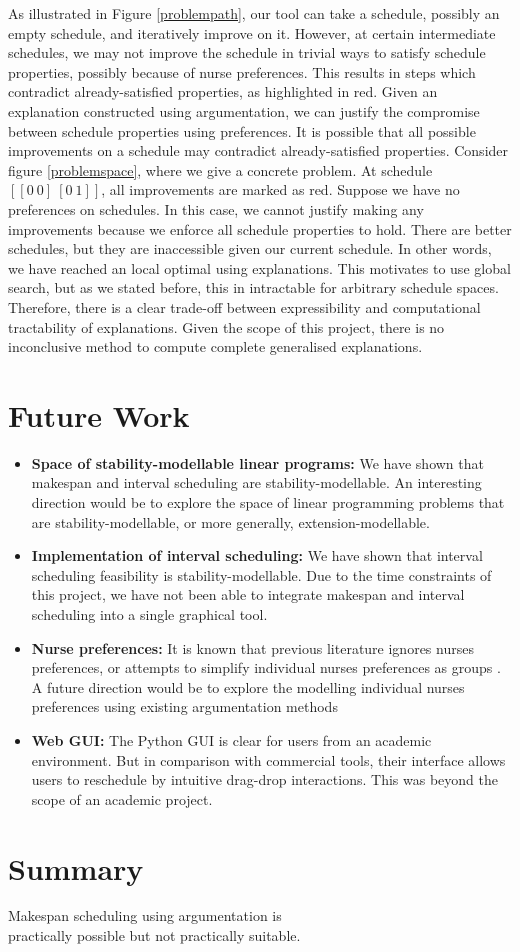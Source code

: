 As illustrated in Figure \ref{problempath}, our tool can take a schedule, possibly an empty schedule, and iteratively improve on it. However, at certain intermediate schedules, we may not improve the schedule in trivial ways to satisfy schedule properties, possibly because of nurse preferences. This results in steps which contradict already-satisfied properties, as highlighted in red. Given an explanation constructed using argumentation, we can justify the compromise between schedule properties using preferences.
\linespace
It is possible that all possible improvements on a schedule may contradict already-satisfied properties. Consider figure \ref{problemspace}, where we give a concrete problem. At schedule $[[0\ 0]\ [0\ 1]]$, all improvements are marked as red. Suppose we have no preferences on schedules. In this case, we cannot justify making any improvements because we enforce all schedule properties to hold. There are better schedules, but they are inaccessible given our current schedule. In other words, we have reached an local optimal using explanations. This motivates to use global search, but as we stated before, this in intractable for arbitrary schedule spaces. Therefore, there is a clear trade-off between expressibility and computational tractability of explanations. Given the scope of this project, there is no inconclusive method to compute complete generalised explanations.

\section{Future Work}

\begin{itemize}
	\item\textbf{Space of stability-modellable linear programs:} We have shown that makespan and interval scheduling are stability-modellable. An interesting direction would be to explore the space of linear programming problems that are stability-modellable, or more generally, extension-modellable.
	\item\textbf{Implementation of interval scheduling:} We have shown that interval scheduling feasibility is stability-modellable. Due to the time constraints of this project, we have not been able to integrate makespan and interval scheduling into a single graphical tool.
	\item\textbf{Nurse preferences:} It is known that previous literature ignores nurses preferences, or attempts to simplify individual nurses preferences as groups \cite{preferences}. A future direction would be to explore the modelling individual nurses preferences using existing argumentation methods \cite{acceptability, aba}
	\item\textbf{Web GUI:} The Python GUI is clear for users from an academic environment. But in comparison with commercial tools, their interface allows users to reschedule by intuitive drag-drop interactions. This was beyond the scope of an academic project.
\end{itemize}

\section{Summary}

\begin{framed}
	\centering
	Makespan scheduling using argumentation is\\practically
	possible but not practically suitable.
\end{framed}